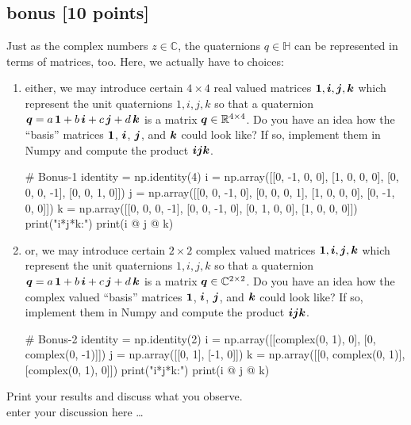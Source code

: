 \color{black}
\newpage





\subsection*{bonus [10 points]}
Just as the complex numbers $z \in \mathbb{C}$, the quaternions $q \in \mathbb{H}$ can be represented in terms of matrices, too. Here, we actually have to choices: 

\begin{enumerate}
\item either, we may introduce certain $4 \times 4$ real valued matrices $\bm{1}, \bm{i}, \bm{j}, \bm{k}$ which represent the unit quaternions $1, i, j, k$ so that a quaternion $\bm{q} = a \, \bm{1} + b \, \bm{i} + c \, \bm{j} + d \, \bm{k}$ is a matrix $\bm{q} \in \mathbb{R}^{4 \times 4}$. Do you have an idea how the ``basis'' matrices $\bm{1}$, $\bm{i}$, $\bm{j}$, and $\bm{k}$ could look like? If so, implement them in Numpy and compute the product $\bm{i} \bm{j} \bm{k}$.
\begin{python}
# Bonus-1
identity = np.identity(4)
i = np.array([[0, -1, 0, 0], [1, 0, 0, 0], [0, 0, 0, -1], [0, 0, 1, 0]])
j = np.array([[0, 0, -1, 0], [0, 0, 0, 1], [1, 0, 0, 0], [0, -1, 0, 0]])
k = np.array([[0, 0, 0, -1], [0, 0, -1, 0], [0, 1, 0, 0], [1, 0, 0, 0]])
print("i*j*k:")
print(i @ j @ k)
\end{python}
\item or, we may introduce certain $2 \times 2$ complex valued matrices $\bm{1}, \bm{i}, \bm{j}, \bm{k}$ which represent the unit quaternions $1, i, j, k$ so that a quaternion $\bm{q} = a \, \bm{1} + b \, \bm{i} + c \, \bm{j} + d \, \bm{k}$ is a matrix $\bm{q} \in \mathbb{C}^{2 \times 2}$. Do you have an idea how the complex valued ``basis'' matrices $\bm{1}$, $\bm{i}$, $\bm{j}$, and $\bm{k}$ could look like? If so, implement them in Numpy and compute the product $\bm{i} \bm{j} \bm{k}$.
\begin{python}
# Bonus-2
identity = np.identity(2)
i = np.array([[complex(0, 1), 0], [0, complex(0, -1)]])
j = np.array([[0, 1], [-1, 0]])
k = np.array([[0, complex(0, 1)], [complex(0, 1), 0]])
print("i*j*k:")
print(i @ j @ k)
\end{python}
\end{enumerate}
Print your results and discuss what you observe.
\color{blue} \\[1ex]
enter your discussion here \ldots
\color{black}

